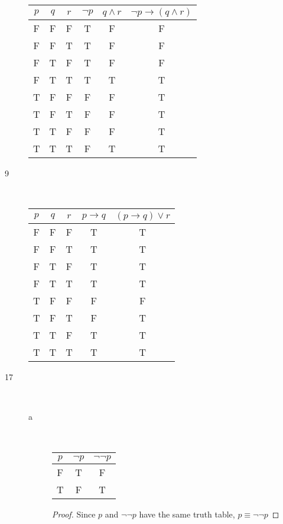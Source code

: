 \begin{description}
		\begin{tabular}{c | c | c | c | c || c}
			$p$ & %
			$q$ & %
			$r$ & %
			$\lnot p$ & %
			$q \land r$ & %
			$\lnot p \rightarrow (q \land r)$ \\ %
			\hline
			F & F & F & T & F & F \\
			F & F & T & T & F & F \\
			F & T & F & T & F & F \\
			F & T & T & T & T & T \\
			T & F & F & F & F & T \\
			T & F & T & F & F & T \\
			T & T & F & F & F & T \\
			T & T & T & F & T & T \\
		\end{tabular}
	\item[9] \hfill \\
		\begin{tabular}{c | c | c | c || c}
			$p$ & %
			$q$ & %
			$r$ & %
			$p \rightarrow q$ & %
			$(p \rightarrow q) \lor r$ \\ %
			\hline
			F & F & F & T & T \\
			F & F & T & T & T \\
			F & T & F & T & T \\
			F & T & T & T & T \\
			T & F & F & F & F \\
			T & F & T & F & T \\
			T & T & F & T & T \\
			T & T & T & T & T \\
		\end{tabular}
	\item[17] \hfill \\
		\begin{description}
			\item[a] \hfill \\
				\begin{tabular}{c | c || c}
					$p$ & %
					$\lnot p$ & %
					$\lnot \lnot p$ \\ %
					\hline
					F & T & F \\
					T & F & T \\
				\end{tabular}
				\begin{proof}
					Since $p$ and $\lnot \lnot p$ have the same truth table,
					$p \equiv \lnot \lnot p$
				\end{proof}

\end{description}
\end{description}
